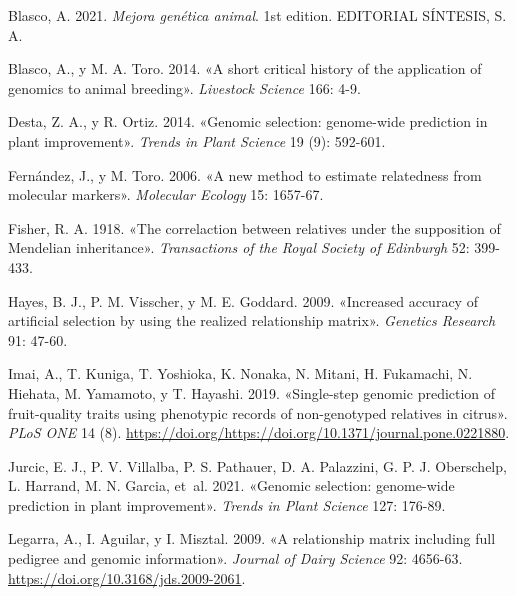 \documentclass[11pt,spanish,a4paper,oneside,]{book} %
\begin{document}
\begingroup
\hspace{\parindent}
\setlength{\parindent}{-0.25in}
\setlength{\leftskip}{0.25in}
\setlength{\parskip}{0pt}

\hypertarget{refs}{}
\leavevmode\hypertarget{ref-cite:21}{}%
Blasco, A. 2021. \emph{Mejora genética animal}. 1st edition. EDITORIAL SÍNTESIS, S. A.

\leavevmode\hypertarget{ref-cite:3}{}%
Blasco, A., y M. A. Toro. 2014. «A short critical history of the application of genomics to animal breeding». \emph{Livestock Science} 166: 4-9.

\leavevmode\hypertarget{ref-cite:10}{}%
Desta, Z. A., y R. Ortiz. 2014. «Genomic selection: genome-wide prediction in plant improvement». \emph{Trends in Plant Science} 19 (9): 592-601.

\leavevmode\hypertarget{ref-cite:24}{}%
Fernández, J., y M. Toro. 2006. «A new method to estimate relatedness from molecular markers». \emph{Molecular Ecology} 15: 1657-67.

\leavevmode\hypertarget{ref-cite:1}{}%
Fisher, R. A. 1918. «The correlaction between relatives under the supposition of Mendelian inheritance». \emph{Transactions of the Royal Society of Edinburgh} 52: 399-433.

\leavevmode\hypertarget{ref-cite:13}{}%
Hayes, B. J., P. M. Visscher, y M. E. Goddard. 2009. «Increased accuracy of artificial selection by using the realized relationship matrix». \emph{Genetics Research} 91: 47-60.

\leavevmode\hypertarget{ref-cite:20}{}%
Imai, A., T. Kuniga, T. Yoshioka, K. Nonaka, N. Mitani, H. Fukamachi, N. Hiehata, M. Yamamoto, y T. Hayashi. 2019. «Single-step genomic prediction of fruit-quality traits using phenotypic records of non-genotyped relatives in citrus». \emph{PLoS ONE} 14 (8). \url{https://doi.org/https://doi.org/10.1371/journal.pone.0221880}.

\leavevmode\hypertarget{ref-cite:11}{}%
Jurcic, E. J., P. V. Villalba, P. S. Pathauer, D. A. Palazzini, G. P. J. Oberschelp, L. Harrand, M. N. Garcia, et~al. 2021. «Genomic selection: genome-wide prediction in plant improvement». \emph{Trends in Plant Science} 127: 176-89.

\leavevmode\hypertarget{ref-cite:17}{}%
Legarra, A., I. Aguilar, y I. Misztal. 2009. «A relationship matrix including full pedigree and genomic information». \emph{Journal of Dairy Science} 92: 4656-63. \url{https://doi.org/10.3168/jds.2009-2061}.
\end{document}
